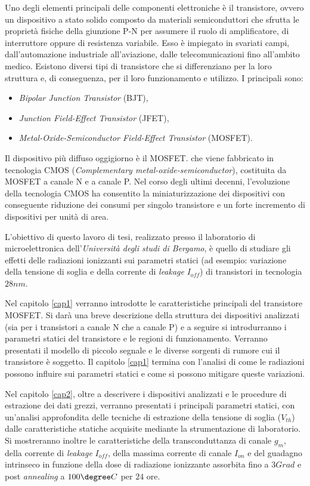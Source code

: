 Uno degli elementi principali delle componenti elettroniche è il transistore, ovvero un dispositivo a stato solido composto da materiali semiconduttori che sfrutta le proprietà fisiche della giunzione P-N per assumere il ruolo di amplificatore, di interruttore oppure di resistenza variabile.
Esso è impiegato in svariati campi, dall'automazione industriale all'aviazione, dalle telecomunicazioni fino all'ambito medico.
Esistono diversi tipi di transistore che si differenziano per la loro struttura e, di conseguenza, per il loro funzionamento e utilizzo. I principali sono:
\begin{itemize}
    \item \textit{Bipolar Junction Transistor} (BJT),
    \item \textit{Junction Field-Effect Transistor} (JFET),
    \item \textit{Metal-Oxide-Semiconductor Field-Effect Transistor} (MOSFET).
\end{itemize}
Il dispositivo più diffuso oggigiorno è il MOSFET. che viene fabbricato in tecnologia CMOS (\textit{Complementary metal-oxide-semiconductor}), costituita da MOSFET a canale N e a canale P. Nel corso degli ultimi decenni, l'evoluzione della tecnologia CMOS ha consentito la miniaturizzazione dei dispositivi con conseguente riduzione dei consumi per singolo transistore e un forte incremento di dispositivi per unità di area.

\vspace*{0.5cm}

L'obiettivo di questo lavoro di tesi, realizzato presso il laboratorio di microelettronica dell'\textit{Università degli studi di Bergamo}, è quello di studiare gli effetti delle radiazioni ionizzanti sui parametri statici (ad esempio: variazione della tensione di soglia e della corrente di \emph{leakage} $I_{off}$) di transistori in tecnologia $28nm$. 

\vspace*{0.5cm}

Nel capitolo \ref{cap1} verranno introdotte le caratteristiche principali del transistore MOSFET.
Si darà una breve descrizione della struttura dei dispositivi analizzati (sia per i transistori a canale N che a canale P) e a seguire si introdurranno i parametri statici del transistore e le regioni di funzionamento. Verranno presentati il modello di piccolo segnale e le diverse sorgenti di rumore cui il transistore è soggetto. Il capitolo \ref{cap1} termina con l'analisi di come le radiazioni possono influire sui parametri statici e come si possono mitigare queste variazioni.

Nel capitolo \ref{cap2}, oltre a descrivere i dispositivi analizzati e le procedure di estrazione dei dati grezzi, verranno presentati i principali parametri statici, con un'analisi approfondita delle tecniche di estrazione della tensione di soglia ($V_{th}$) dalle caratteristiche statiche acquisite mediante la strumentazione di laboratorio. Si mostreranno inoltre le caratteristiche della transconduttanza di canale $g_m$, della corrente di \emph{leakage} $I_{off}$, della massima corrente di canale $I_{on}$ e del guadagno intrinseco in funzione della dose di radiazione ionizzante assorbita fino a $3 Grad$ e post \emph{annealing} a $100\degree C$ per $24$ ore.
